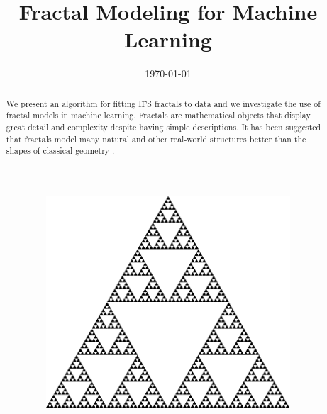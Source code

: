 \documentclass[10pt,a4paper,oneside]{article}
\title{Fractal Modeling for Machine Learning}
\date{\today}
\theoremstyle{definition}
\begin{document}
\maketitle

\begin{abstract}
\noindent We present an algorithm for fitting IFS fractals to data and we investigate the use of fractal models in machine learning. Fractals are mathematical objects that display great detail and complexity despite having simple descriptions. It has been suggested that fractals model many natural and other real-world structures better than the shapes of classical geometry \cite{mandelbrot1982fractal}.
\end{abstract}

\begin{figure}[b]
  \centering
  \begin{subfigure}[b]{0.3\textwidth}
    \includegraphics[width=\textwidth]{../img/sierpinski.pdf}
    \caption{}
    \label{fig:sierpinski}
  \end{subfigure}  
  \hspace{0.03\textwidth}
  \begin{subfigure}[b]{0.3\textwidth}

\end{subfigure}
\end{figure}
\end{document}
